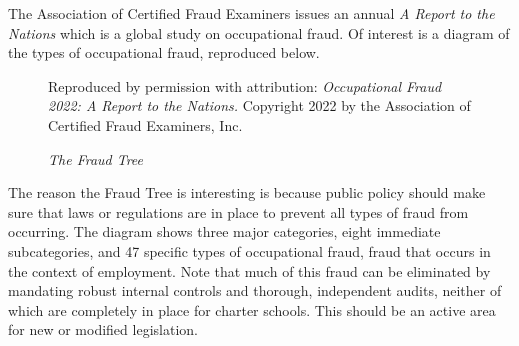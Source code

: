 The Association of Certified Fraud Examiners issues an annual \textit{A Report to the Nations} which is a global study on occupational fraud. Of interest is a diagram of the types of occupational fraud, reproduced below.
\begin{figure}[htbp]
  \caption{\textit{The Fraud Tree}}%
  \label{fig:fraud-tree}\centering%
  {Reproduced by permission with attribution: \textit{Occupational Fraud 2022: A Report to the Nations.} Copyright 2022 by the Association of Certified Fraud Examiners, Inc.}
\end{figure}
The reason the Fraud Tree is interesting is because public policy should make sure that laws or regulations are in place to prevent all types of fraud from occurring. The diagram shows three major categories, eight immediate subcategories, and 47 specific types of occupational fraud, fraud that occurs in the context of employment. Note that much of this fraud can be eliminated by mandating robust internal controls and thorough, independent audits, neither of which are completely in place for charter schools. This should be an active area for new or modified legislation.

